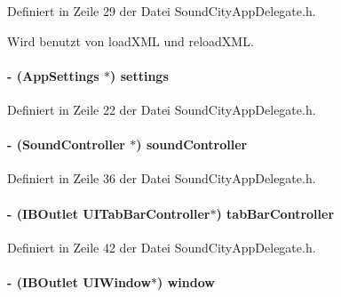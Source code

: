 Definiert in Zeile 29 der Datei SoundCityAppDelegate.h.

Wird benutzt von loadXML und reloadXML.\hypertarget{interface_sound_city_app_delegate_a0e22551289b704c129fd5268ff45c8ad}{
\paragraph[{settings}]{\setlength{\rightskip}{0pt plus 5cm}-\/ ({\bf AppSettings} $\ast$) settings}\hfill}
\label{interface_sound_city_app_delegate_a0e22551289b704c129fd5268ff45c8ad}


Definiert in Zeile 22 der Datei SoundCityAppDelegate.h.\hypertarget{interface_sound_city_app_delegate_a05e1eebd4d2b5cefeb4237ac3c94500b}{
\paragraph[{soundController}]{\setlength{\rightskip}{0pt plus 5cm}-\/ ({\bf SoundController} $\ast$) soundController}\hfill}
\label{interface_sound_city_app_delegate_a05e1eebd4d2b5cefeb4237ac3c94500b}


Definiert in Zeile 36 der Datei SoundCityAppDelegate.h.\hypertarget{interface_sound_city_app_delegate_abeda0b4bd58fbf9cf62b1641f7fdf31c}{
\paragraph[{tabBarController}]{\setlength{\rightskip}{0pt plus 5cm}-\/ (IBOutlet UITabBarController$\ast$) {\bf tabBarController}}\hfill}
\label{interface_sound_city_app_delegate_abeda0b4bd58fbf9cf62b1641f7fdf31c}


Definiert in Zeile 42 der Datei SoundCityAppDelegate.h.\hypertarget{interface_sound_city_app_delegate_a2bb7d766b3f7e8c43fad9f7c5050549e}{
\paragraph[{window}]{\setlength{\rightskip}{0pt plus 5cm}-\/ (IBOutlet UIWindow$\ast$) {\bf window}}\hfill}
\label{interface_sound_city_app_delegate_a2bb7d766b3f7e8c43fad9f7c5050549e}


